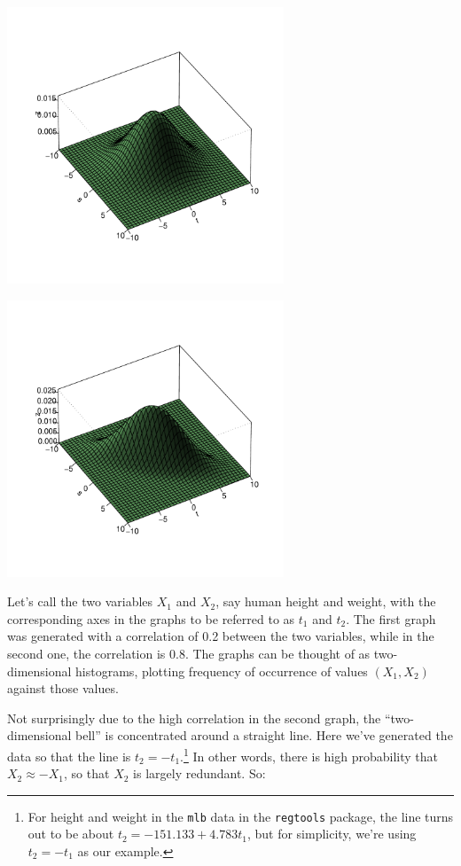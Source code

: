 \begin{minipage}[b]{0.65\linewidth}
    \mbox{\includegraphics[width=3.25in]{Images/Rho2.pdf}} 
\end{minipage}
\hspace{0.0in}
\begin{minipage}[b]{0.65\linewidth}
    \mbox{\includegraphics[width=3.25in]{Images/Rho8.pdf}} 
\end{minipage}

Let's call the two variables $X_1$ and $X_2$, say human height and
weight, with the corresponding axes in the graphs to be referred to as
$t_1$ and $t_2$.  The first graph was generated with a correlation of
0.2 between the two variables, while in the second one, the correlation
is 0.8.  The graphs can be thought of as two-dimensional histograms,
plotting frequency of occurrence of values $(X_1,X_2)$ against those
values.

Not surprisingly due to the high correlation in the second graph, the
``two-dimensional bell'' is concentrated around a straight line.  Here
we've generated the data so that the line is $t_2 = - t_1$.\footnote{For
height and weight in the \lstinline{mlb} data in the
\lstinline{regtools} package, the line turns out to be about $t_2 =
-151.133 + 4.783 t_1$, but for simplicity, we're using $t_2 = - t_1$ as
our example.} In other words, there is high probability that $X_2
\approx -X_1$, so that $X_2$ is largely redundant.  So:

